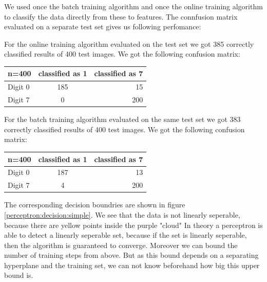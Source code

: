 We used once the batch training algorithm and once the online training algorithm to classify the data directly from these to features. The connfusion matrix evaluated on a separate test set gives us following perfomance:

For the online training algorithm evaluated on the test set we got 385 correctly classified results of 400 test images. We got the following confusion matrix:

\begin{tabular}{ l | c | r }
\centering
  n=400 & classified as 1 & classified as 7 \\ \hline
  Digit 0 & 185 & 15 \\
  Digit 7 & 0 & 200 \\
\end{tabular}

For the batch training algorithm evaluated on the same test set we got 383 correctly classified results of 400 test images. We got the following confusion matrix:

\begin{tabular}{ l | c | r }
\centering
  n=400 & classified as 1 & classified as 7 \\ \hline
  Digit 0 & 187 & 13 \\
  Digit 7 & 4 & 200 \\
\end{tabular}

The corresponding decision boundries are shown in figure \ref{perceptron:decision:simple}. We see that the data is not linearly seperable, because there are yellow points inside the purple "cloud" In theory a perceptron is able to detect a linearly seperable set, because if the set is linearly seperable, then the algorithm is guaranteed to converge. Moreover we can bound the number of training steps from above. But as this bound depends on a separating hyperplane and the training set, we can not know beforehand how big this upper bound is.

